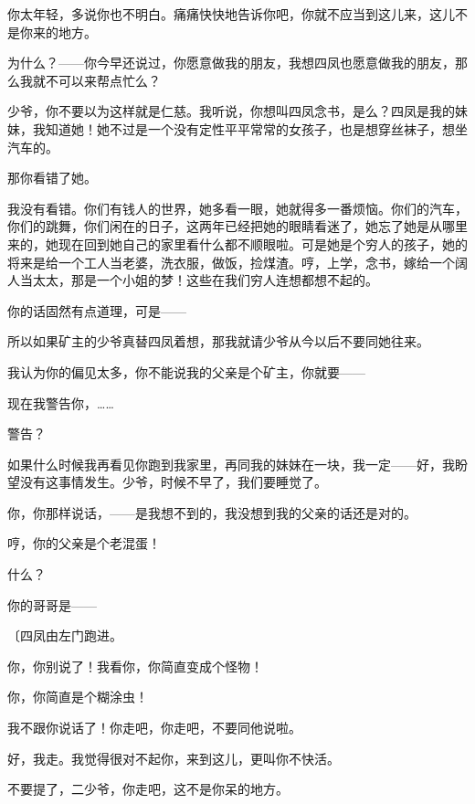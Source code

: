 你太年轻，多说你也不明白。痛痛快快地告诉你吧，你就不应当到这儿来，这儿不是你来的地方。

为什么？——你今早还说过，你愿意做我的朋友，我想四凤也愿意做我的朋友，那么我就不可以来帮点忙么？

少爷，你不要以为这样就是仁慈。我听说，你想叫四凤念书，是么？四凤是我的妹妹，我知道她！她不过是一个没有定性平平常常的女孩子，也是想穿丝袜子，想坐汽车的。

那你看错了她。

我没有看错。你们有钱人的世界，她多看一眼，她就得多一番烦恼。你们的汽车，你们的跳舞，你们闲在的日子，这两年已经把她的眼睛看迷了，她忘了她是从哪里来的，她现在回到她自己的家里看什么都不顺眼啦。可是她是个穷人的孩子，她的将来是给一个工人当老婆，洗衣服，做饭，捡煤渣。哼，上学，念书，嫁给一个阔人当太太，那是一个小姐的梦！这些在我们穷人连想都想不起的。

你的话固然有点道理，可是——

所以如果矿主的少爷真替四凤着想，那我就请少爷从今以后不要同她往来。

我认为你的偏见太多，你不能说我的父亲是个矿主，你就要——

现在我警告你，……

警告？

如果什么时候我再看见你跑到我家里，再同我的妹妹在一块，我一定——好，我盼望没有这事情发生。少爷，时候不早了，我们要睡觉了。

你，你那样说话，——是我想不到的，我没想到我的父亲的话还是对的。

哼，你的父亲是个老混蛋！

什么？

你的哥哥是——

{\fangsong〔四凤由左门跑进。}

你，你别说了！我看你，你简直变成个怪物！

你，你简直是个糊涂虫！

我不跟你说话了！你走吧，你走吧，不要同他说啦。

好，我走。我觉得很对不起你，来到这儿，更叫你不快活。

不要提了，二少爷，你走吧，这不是你呆的地方。

